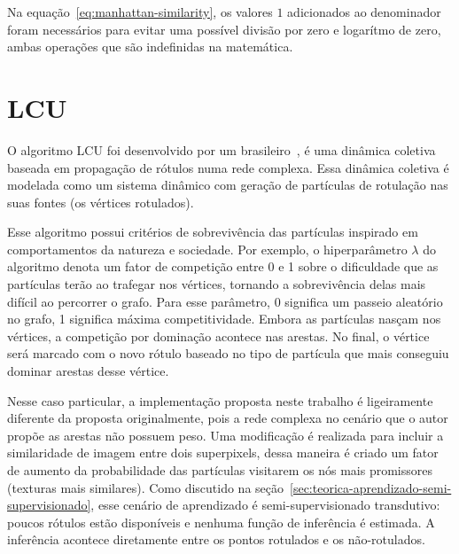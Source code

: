 Na equação~\ref{eq:manhattan-similarity}, os valores $1$ adicionados
ao denominador foram necessários para evitar uma possível divisão por
zero e logarítmo de zero, ambas operações que são indefinidas na
matemática.


\section{LCU}\label{sec:teorica-lcu}

O algoritmo \gls{LCU} foi desenvolvido por um
brasileiro~\cite{VerriNetworkUnfoldingMap2018}, é uma dinâmica
coletiva baseada em propagação de rótulos numa rede complexa. Essa
dinâmica coletiva é modelada como um sistema dinâmico com geração de
partículas de rotulação nas suas fontes (os vértices rotulados).

Esse algoritmo possui critérios de sobrevivência das partículas
inspirado em comportamentos da natureza e sociedade. Por exemplo, o
hiperparâmetro $ \lambda $ do algoritmo denota um fator de competição entre
0 e 1 sobre o dificuldade que as partículas terão ao trafegar nos
vértices, tornando a sobrevivência delas mais difícil ao percorrer o
grafo. Para esse parâmetro, 0 significa um passeio aleatório no grafo,
1 significa máxima competitividade. Embora as partículas nasçam nos
vértices, a competição por dominação acontece nas arestas. No final, o
vértice será marcado com o novo rótulo baseado no tipo de partícula
que mais conseguiu dominar arestas desse vértice.

Nesse caso particular, a implementação proposta neste trabalho é
ligeiramente diferente da proposta originalmente, pois a rede complexa
no cenário que o autor propõe as arestas não possuem peso. Uma
modificação é realizada para incluir a similaridade de imagem entre
dois superpixels, dessa maneira é criado um fator de aumento da
probabilidade das partículas visitarem os nós mais promissores
(texturas mais similares). Como discutido na
seção~\ref{sec:teorica-aprendizado-semi-supervisionado}, esse cenário
de aprendizado é semi-supervisionado transdutivo: poucos rótulos estão
disponíveis e nenhuma função de inferência é estimada. A inferência
acontece diretamente entre os pontos rotulados e os não-rotulados.


